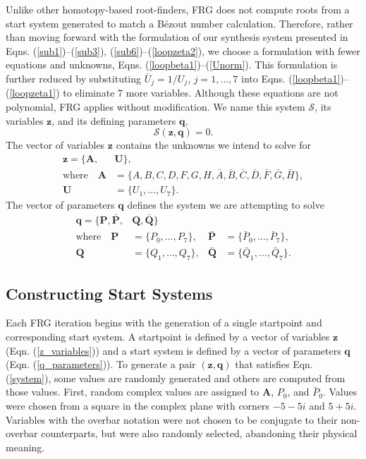 \documentclass[journal]{IEEEtran}
\def\*#1{\bar{#1}} %
\begin{document}
Unlike other homotopy-based root-finders, FRG does not compute roots from a start system generated to match a B\'{e}zout number calculation.
Therefore, rather than moving forward with the formulation of our synthesis system presented in Eqns. (\ref{sub1})--(\ref{sub3}), (\ref{sub6})--(\ref{loopzeta2}), we choose a formulation with fewer equations and unknowns, Eqns. (\ref{loopbeta1})--(\ref{Unorm}).
This formulation is further reduced by substituting $\*U_j = 1/U_j$, $j=1,\ldots,7$ into Eqns. (\ref{loopbeta1})--(\ref{loopzeta1}) to eliminate 7 more variables. 
Although these equations are not polynomial, FRG applies without modification.
We name this system $\mathcal{S}$, its variables $\mathbf{z}$, and its defining parameters $\mathbf{q}$,
\begin{equation}
\mathcal{S}(\mathbf{z},\mathbf{q}) = 0.
\label{system}
\end{equation}
The vector of variables $\mathbf{z}$ contains the unknowns we intend to solve for
\begin{align}
\mathbf{z} = \{ \mathbf{A}, &\mathbf{U} \}, \label{z_variables}\\
\text{where} \quad
\mathbf{A} &= \{ A, B, C, D, F, G, H, \*A, \*B, \*C, \*D, \*F, \*G, \*H \}, \nonumber\\
\mathbf{U} &= \{ U_1, \ldots, U_7 \}. \nonumber
\end{align}
The vector of parameters $\mathbf{q}$ defines the system we are attempting to solve
\begin{align}
\mathbf{q} = \{\mathbf{P}, \*{\mathbf{P}}, &\mathbf{Q}, \*{\mathbf{Q}} \} & & \label{q_parameters}\\
\text{where} \quad
\mathbf{P} &= \{ P_0, \ldots, P_7 \}, & \*{\mathbf{P}} &= \{ \*P_0, \ldots, \*P_7 \}, \nonumber\\
\mathbf{Q} &= \{ Q_1, \ldots, Q_7 \}, & \*{\mathbf{Q}} &= \{ \*Q_1, \ldots, \*Q_7 \}. \nonumber
\end{align}



\subsection{Constructing Start Systems}
\label{sec:start_sys}


Each FRG iteration begins with the generation of a single startpoint and corresponding start system.  A startpoint is defined by a vector of variables $\mathbf{z}$ (Eqn. (\ref{z_variables})) and a start system is defined by a vector of parameters $\mathbf{q}$ (Eqn. (\ref{q_parameters})).
To generate a pair $(\mathbf{z}, \mathbf{q})$ that satisfies Eqn. (\ref{system}), some values are randomly generated and others are computed from those values.
First, random complex values are assigned to $\mathbf{A}$, $P_0$, and $\*P_0$.  
Values were chosen from a square in the complex plane with corners $-5-5i$ and $5+5i$.
Variables with the overbar notation were not chosen to be conjugate to their non-overbar counterparts, but were also randomly selected, abandoning their physical meaning.
\end{document}

